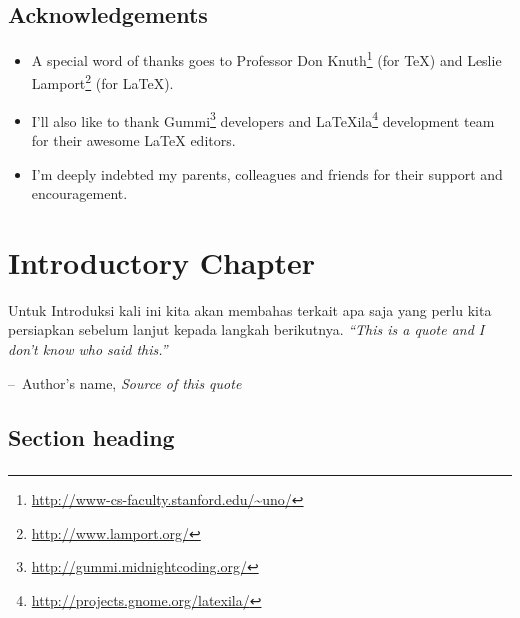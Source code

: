 \documentclass[a4paper,11pt]{book}
\makeatletter
\newenvironment{chapquote}[2][2em]
  {\setlength{\@tempdima}{#1}%
   \def\chapquote@author{#2}%
   \parshape 1 \@tempdima \dimexpr\textwidth-2\@tempdima\relax%
   \itshape}
  {\par\normalfont\hfill--\ \chapquote@author\hspace*{\@tempdima}\par\bigskip}
\makeatother
\begin{document}
\section*{Acknowledgements}
\begin{itemize}
\item A special word of thanks goes to Professor Don Knuth\footnote{\url{http://www-cs-faculty.stanford.edu/~uno/}} (for \TeX{}) and Leslie Lamport\footnote{\url{http://www.lamport.org/}} (for \LaTeX{}).
\item I'll also like to thank Gummi\footnote{\url{http://gummi.midnightcoding.org/}} developers and LaTeXila\footnote{\url{http://projects.gnome.org/latexila/}} development team for their awesome \LaTeX{} editors.
\item I'm deeply indebted my parents, colleagues and friends for their support and encouragement.
\end{itemize}

\chapter{Introductory Chapter}
Untuk Introduksi kali ini kita akan membahas terkait apa saja yang perlu kita persiapkan sebelum lanjut kepada langkah berikutnya.
\begin{chapquote}{Author's name, \textit{Source of this quote}}
``This is a quote and I don't know who said this.''
\end{chapquote}

\section{Section heading}


\subsection{}


\subsection{}

\subsection{}


\subsection{}
\end{document}
